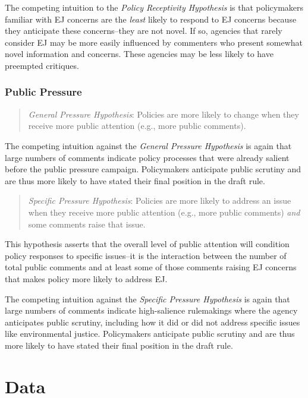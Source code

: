 \documentclass[
      12pt,
        ]{article}
\begin{document}
The competing intuition to the \emph{Policy Receptivity Hypothesis} is that policymakers familiar with EJ concerns are the \emph{least} likely to respond to EJ concerns because they anticipate these concerns--they are not novel. If so, agencies that rarely consider EJ may be more easily influenced by commenters who present somewhat novel information and concerns. These agencies may be less likely to have preempted critiques.

\hypertarget{public-pressure}{%
\subsubsection{Public Pressure}\label{public-pressure}}

\begin{quote}
\emph{General Pressure Hypothesis}: Policies are more likely to change when they receive more public attention (e.g., more public comments).
\end{quote}

The competing intuition against the \emph{General Pressure Hypothesis} is again that large numbers of comments indicate policy processes that were already salient before the public pressure campaign. Policymakers anticipate public scrutiny and are thus more likely to have stated their final position in the draft rule.

\begin{quote}
\emph{Specific Pressure Hypothesis}: Policies are more likely to address an issue when they receive more public attention (e.g., more public comments) \emph{and} some comments raise that issue.
\end{quote}

This hypothesis asserts that the overall level of public attention will condition policy responses to specific issues--it is the interaction between the number of total public comments and at least some of those comments raising EJ concerns that makes policy more likely to address EJ.

The competing intuition against the \emph{Specific Pressure Hypothesis} is again that large numbers of comments indicate high-salience rulemakings where the agency anticipates public scrutiny, including how it did or did not address specific issues like environmental justice. Policymakers anticipate public scrutiny and are thus more likely to have stated their final position in the draft rule.

\hypertarget{data}{%
\section{Data}\label{data}}
\end{document}
